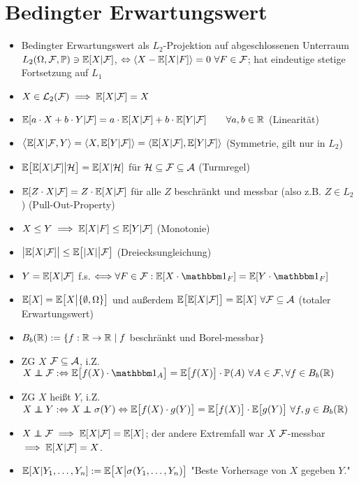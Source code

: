 \documentclass[12pt]{scrartcl}
\begin{document}
	\section{Bedingter Erwartungswert}
	\begin{itemize}
		\item Bedingter Erwartungswert als $L_2$-Projektion auf abgeschlossenen Unterraum $L_2(\Omega,\mathcal{F},\mathbb{P})\ni\mathbb{E}[X|\mathcal{F}]$, $\Leftrightarrow\langle X-\mathbb{E}[X|F]\rangle=0~\forall F\in\mathcal{F}$; hat eindeutige stetige Fortsetzung auf $L_1$
		\item $X\in\mathcal{L}_2(\mathcal{F})\implies\mathbb{E}[X|\mathcal{F}]=X$
		\item $\mathbb{E}[a\cdot X+b\cdot Y|\mathcal{F}]=a\cdot\mathbb{E}[X|\mathcal{F}]+b\cdot\mathbb{E}[Y|\mathcal{F}]\qquad\forall a,b\in\mathbb{R}$ (Linearität)
		\item $\big\langle\mathbb{E}[X|\mathcal{F},Y\rangle=\langle X,\mathbb{E}[Y|\mathcal{F}]\rangle=\langle\mathbb{E}[X|\mathcal{F}],\mathbb{E}[Y|\mathcal{F}]\rangle$ (Symmetrie, gilt nur in $L_2$)
		\item $\mathbb{E}\big[\mathbb{E}[X|\mathcal{F}]\big|\mathcal{H}\big]=\mathbb{E}[X|\mathcal{H}]$ für $\mathcal{H}\subseteq\mathcal{F}\subseteq\mathcal{A}$ (Turmregel)
		\item $\mathbb{E}[Z\cdot X|\mathcal{F}]=Z\cdot\mathbb{E}[X|\mathcal{F}]$ für alle $Z$ beschränkt und messbar (also z.B. $Z\in L_2$) (Pull-Out-Property)
		\item $X\leq Y\implies \mathbb{E}[X|F]\leq\mathbb{E}[Y|\mathcal{F}]$ (Monotonie)
		\item $\big|\mathbb{E}[X|\mathcal{F}]\big|\leq\mathbb{E}\big[|X|\big|\mathcal{F}\big]$ (Dreiecksungleichung)
		\item $Y=\mathbb{E}[X|\mathcal{F}]$ f.s. $\Longleftrightarrow\forall F\in\F:\E[X\cdot\indi_F]=\E[Y\cdot\indi_F]$
		\item $\mathbb{E}[X]=\mathbb{E}\big[X\big|\lbrace\emptyset,\Omega\rbrace\big]$ und außerdem $\mathbb{E}\big[\mathbb{E}[X|\mathcal{F}]\big]=\mathbb{E}[X]~\forall\mathcal{F}\subseteq\mathcal{A}$ (totaler Erwartungswert)
		\item $B_b(\mathbb{R}):=\lbrace f:\mathbb{R}\to\mathbb{R}\mid f$ beschränkt und Borel-messbar$\rbrace$
		\item ZG $X$  $\mathcal{F}\subseteq\mathcal{A}$, i.Z. $X\unab\F:\gdw\E\big[f(X)\cdot\indi_A\big]=\E\big[f(X)\big]\cdot\P(A)~\forall A\in\F,\forall f\in B_b(\R)$
		\item ZG $X$ heißt  $Y$, i.Z. $X\unab Y:\gdw X\unab\sigma(Y)\gdw\E\big[f(X)\cdot g(Y)\big]=\E\big[f(X)\big]\cdot\E\big[g(Y)\big]~\forall f,g\in B_b(\R)$
		\item $X\unab\F\implies\E[X|\F]=\E[X]$; der andere Extremfall war $X$ $\mathcal{F}$-messbar $\implies\mathbb{E}[X|\mathcal{F}]=X$.
		\item $\mathbb{E}[X|Y_1,\ldots,Y_n]:=\mathbb{E}\big[X\big|\sigma(Y_1,\ldots,Y_n)\big]$ "Beste Vorhersage von $X$ gegeben $Y$."
	\end{itemize}
	
\end{document}
